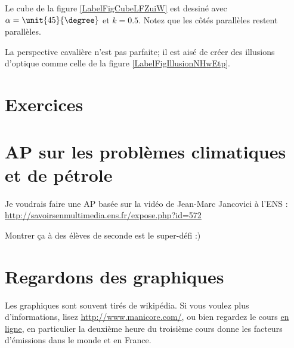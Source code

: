 Le cube de la figure \ref{LabelFigCubeLFZuiW} est dessiné avec \( \alpha=\unit{45}{\degree}\) et \( k=0.5\). Notez que les côtés parallèles restent parallèles.
\newcommand{\CaptionFigCubeLFZuiW}{Les segments perpendiculaires à la feuille sont de longueur moitié des autres.}


La perspective cavalière n'est pas parfaite; il est aisé de créer des illusions d'optique comme celle de la figure \ref{LabelFigIllusionNHwEtp}. %
\newcommand{\CaptionFigIllusionNHwEtp}{Une petite illusion d'optique facile.}


\section{Exercices}


\section{AP sur les problèmes climatiques et de pétrole}

Je voudrais faire une AP basée sur la vidéo de Jean-Marc Jancovici à l'ENS :
\url{http://savoirsenmultimedia.ens.fr/expose.php?id=572}

Montrer ça à des élèves de seconde est le super-défi :)



\section{Regardons des graphiques}

Les graphiques sont souvent tirés de wikipédia. Si vous voulez plus d'informations, lisez \url{http://www.manicore.com/}, ou bien regardez le cours \href{http://www.mines-paristech.fr/ingenieurcivil/SitesIC/Balado/Climat_som.html}{en ligne}, en particulier la deuxième heure du troisième cours donne les facteurs d'émissions dans le monde et en France.

